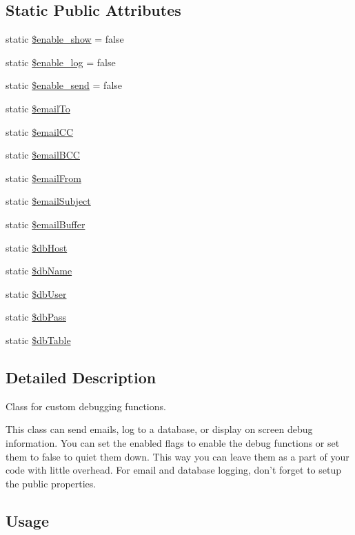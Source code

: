 \subsection*{Static Public Attributes}
\begin{DoxyCompactItemize}
\item 
static \hyperlink{class_debug_a5789d2d16b0d24dc6aa96b63b4f6f605}{\$enable\-\_\-show} = false
\item 
static \hyperlink{class_debug_abf6da1366fe6b13a73e55c0962433b5f}{\$enable\-\_\-log} = false
\item 
static \hyperlink{class_debug_aeb64a58109ab72544114d51e42a3ca4f}{\$enable\-\_\-send} = false
\item 
static \hyperlink{class_debug_a2dca3002fa879522effbe7bd729d681d}{\$email\-To}
\item 
static \hyperlink{class_debug_aef55490ba633a1821bc784c7c5e5a5e5}{\$email\-C\-C}
\item 
static \hyperlink{class_debug_ace2c8fd77a23d56cfdc35a142df1b1ab}{\$email\-B\-C\-C}
\item 
static \hyperlink{class_debug_a8812e953c70aa15f8f01e0a83230e645}{\$email\-From}
\item 
static \hyperlink{class_debug_afc4243e1cc62688011c169b622433f64}{\$email\-Subject}
\item 
static \hyperlink{class_debug_a6da5505f5274a47a70fb0cbac5eef25e}{\$email\-Buffer}
\item 
static \hyperlink{class_debug_ad0ddb2725e69c88a729e0cc242a1b2a6}{\$db\-Host}
\item 
static \hyperlink{class_debug_a68f39949e76b64662a06cb56579d91c3}{\$db\-Name}
\item 
static \hyperlink{class_debug_a4a92606de85aafdc0dcae4976b7ca669}{\$db\-User}
\item 
static \hyperlink{class_debug_a30d808caf55f524798c6a5aaafd633ad}{\$db\-Pass}
\item 
static \hyperlink{class_debug_adfd23e5286c56c7632ecb55887dd2555}{\$db\-Table}
\end{DoxyCompactItemize}


\subsection{Detailed Description}
Class for custom debugging functions.

This class can send emails, log to a database, or display on screen debug information. You can set the enabled flags to enable the debug functions or set them to false to quiet them down. This way you can leave them as a part of your code with little overhead. For email and database logging, don't forget to setup the public properties.\hypertarget{nav1_usage}{}\subsection{Usage}\label{nav1_usage}

